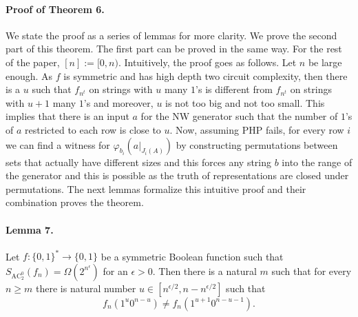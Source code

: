 \documentclass[10pt,a4paper]{article}
\begin{document}
\paragraph{Proof of Theorem 6.} We state the proof as a series of lemmas for more clarity. We prove the second part of this theorem. The first part can be proved in the same way. For the rest of the paper, $[n]:=[0,n)$.
Intuitively, the proof goes as follows. Let $n$ be large enough. As $f$ is symmetric and has high depth two circuit complexity, then there is a $u$ such that $f_{n^t}$ on strings with $u$ many $1$'s is different from $f_{n^t}$ on strings with $u+1$ many $1$'s and moreover, $u$ is not too big and not too small. This implies that there is an input $a$ for the NW generator such that the number of $1$'s of $a$ restricted to each row is close to $u$. Now, assuming PHP fails, for every row $i$ we can find a witness for $\varphi_{b_i}(a|_{J_i(A)})$ by constructing permutations between sets that actually have different sizes and this forces any string $b$ into the range of the generator and this is possible as the truth of representations are closed under permutations. The next lemmas formalize this intuitive proof and their combination proves the theorem.
\paragraph{Lemma 7.} Let $f:\{0,1\}^*\to\{0,1\}$ be a symmetric Boolean function such that $S_{\mathrm{AC}_2^0}(f_n)=\Omega(2^{n^\epsilon})$ for an $\epsilon>0$. Then there is a natural $m$ such that for every $n\geq m$ there is natural number $u\in[n^{\epsilon/2},n-n^{\epsilon/2}]$ such that
\[f_n(1^u0^{n-u})\neq f_n(1^{u+1}0^{n-u-1}).\]
\end{document}
